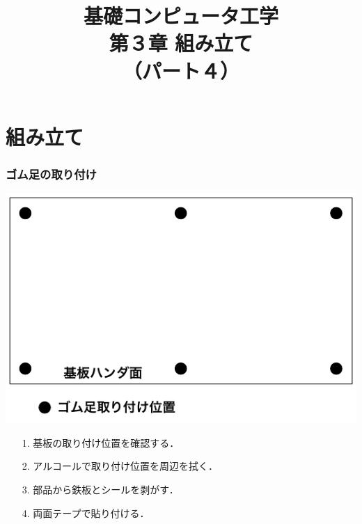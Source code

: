 \documentclass{beamer}                 %
\begin{document}
\title{基礎コンピュータ工学\\第３章 組み立て\\（パート４）}
\date{}

\begin{frame}
  \titlepage
\end{frame}


\section{組み立て}
\begin{frame}
  \frametitle{ゴム足の取り付け}
  \vfill
  \centerline{\includegraphics[scale=0.7]{../Tikz/asi.pdf}}
  \vfill
  \begin{enumerate}
    \item[1.] 基板の取り付け位置を確認する．
    \item[2.] アルコールで取り付け位置を周辺を拭く．
    \item[3.] 部品から鉄板とシールを剥がす．
    \item[4.] 両面テープで貼り付ける．
  \end{enumerate}
  \vfill
\end{frame}
\end{document}
